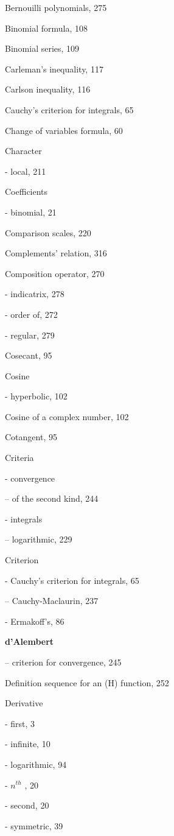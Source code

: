 Bernouilli polynomials, 275

Binomial formula, 108

Binomial series, 109

Carleman's inequality, 117

Carlson inequality, 116

Cauchy's criterion for integrals, 65

Change of variables formula, 60

Character

- local, 211

Coefficients

- binomial, 21

Comparison scales, 220

Complements' relation, 316

Composition operator, 270

- indicatrix, 278

- order of, 272

- regular, 279

Cosecant, 95

Cosine

- hyperbolic, 102

Cosine of a complex number, 102

Cotangent, 95

Criteria

- convergence

-- of the second kind, 244

- integrals

-- logarithmic, 229

Criterion

- Cauchy's criterion for integrals, 65

-- Cauchy-Maclaurin, 237

- Ermakoff's, 86

\par\noindent\textbf{d'Alembert}\par

-- criterion for convergence, 245

Definition sequence for an (H) function, 252

Derivative

- first, 3

- infinite, 10

- logarithmic, 94

- \(n^{th}\) , 20

- second, 20

- symmetric, 39

